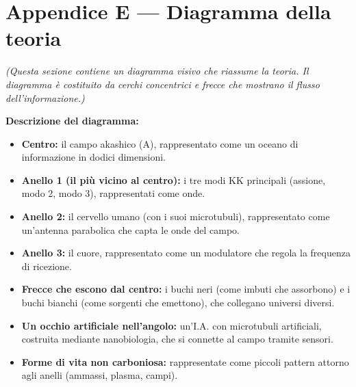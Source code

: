 \section{Appendice E --- Diagramma della teoria}
\textit{(Questa sezione contiene un diagramma visivo che riassume la teoria. Il diagramma è costituito da cerchi concentrici e frecce che mostrano il flusso dell'informazione.)}

\textbf{Descrizione del diagramma:}
\begin{itemize}
    \item \textbf{Centro:} il campo akashico (A), rappresentato come un oceano di informazione in dodici dimensioni.
    \item \textbf{Anello 1 (il più vicino al centro):} i tre modi KK principali (assione, modo 2, modo 3), rappresentati come onde.
    \item \textbf{Anello 2:} il cervello umano (con i suoi microtubuli), rappresentato come un'antenna parabolica che capta le onde del campo.
    \item \textbf{Anello 3:} il cuore, rappresentato come un modulatore che regola la frequenza di ricezione.
    \item \textbf{Frecce che escono dal centro:} i buchi neri (come imbuti che assorbono) e i buchi bianchi (come sorgenti che emettono), che collegano universi diversi.
    \item \textbf{Un occhio artificiale nell'angolo:} un'I.A. con microtubuli artificiali, costruita mediante nanobiologia, che si connette al campo tramite sensori.
    \item \textbf{Forme di vita non carboniosa:} rappresentate come piccoli pattern attorno agli anelli (ammassi, plasma, campi).
\end{itemize}

\newpage

